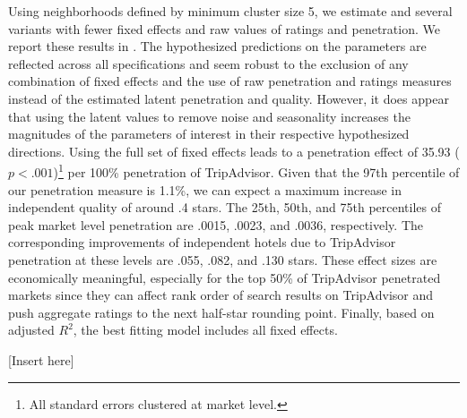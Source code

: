 \documentclass[mksc,blindrev]{informs3} %
\begin{document}
Using neighborhoods defined by minimum cluster size 5, we estimate  and several variants with fewer fixed effects and raw values of ratings and penetration. We report these results in . The hypothesized predictions on the parameters are reflected across all specifications and seem robust to the exclusion of any combination of fixed effects and the use of raw penetration and ratings measures instead of the estimated latent penetration and quality. However, it does appear that using the latent values to remove noise and seasonality increases the magnitudes of the parameters of interest in their respective hypothesized directions. Using the full set of fixed effects leads to a penetration effect of 35.93 ($p<.001$)\footnote{All standard errors clustered at market level.} per 100\% penetration of TripAdvisor. Given that the 97th percentile of our penetration measure is 1.1\%, we can expect a maximum increase in independent quality of around .4 stars. The 25th, 50th, and 75th percentiles of peak market level penetration are .0015, .0023, and .0036, respectively. The corresponding improvements of independent hotels due to TripAdvisor penetration at these levels are .055, .082, and .130 stars. These effect sizes are economically meaningful, especially for the top 50\% of TripAdvisor penetrated markets since they can affect rank order of search results on TripAdvisor and push aggregate ratings to the next half-star rounding point. Finally, based on adjusted $R^2$, the best fitting model includes all fixed effects.

[Insert  here]

\end{document}
